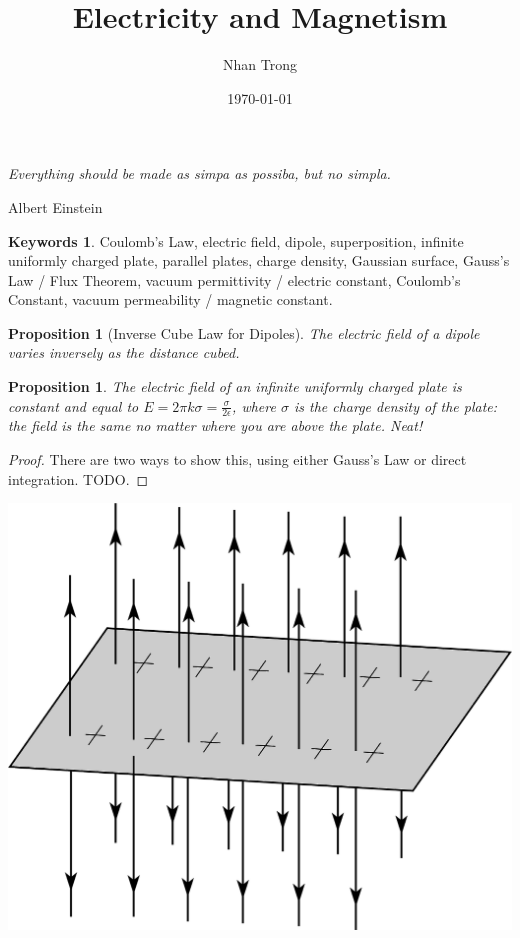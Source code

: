 \documentclass[12pt]{article}
\title{Electricity and Magnetism}
\author{Nhan Trong}
\date{\today}                                           %
\theoremstyle{plain}
\newtheorem{proposition}[theorem]{Proposition}
\theoremstyle{definition}
\newtheorem*{keywords}{Keywords}
\theoremstyle{remark}
\begin{document}
\maketitle

\epigraph{\textit{Everything should be made as simpa as possiba, but no simpla.}}{Albert Einstein}

\begin{keywords}
Coulomb's Law, electric field, dipole, superposition, infinite uniformly charged plate, parallel plates, charge density, Gaussian surface, Gauss's Law / Flux Theorem, vacuum permittivity / electric constant, Coulomb's Constant, vacuum permeability / magnetic constant.
\end{keywords}

\begin{proposition}[Inverse Cube Law for Dipoles]
The electric field of a dipole varies inversely as the distance cubed.
\end{proposition}

\begin{proposition}
The electric field of an infinite uniformly charged plate is constant and equal to $E = 2 \pi k \sigma = \frac{\sigma}{2 \epsilon}$, where $\sigma$ is the charge density of the plate: the field is the same no matter where you are above the plate. Neat!
\end{proposition}

\begin{proof}
There are two ways to show this, using either Gauss's Law or direct integration. TODO.
\end{proof}

\centerline{\includegraphics[width=1.0\textwidth]{infiniteplate}}
\end{document}
